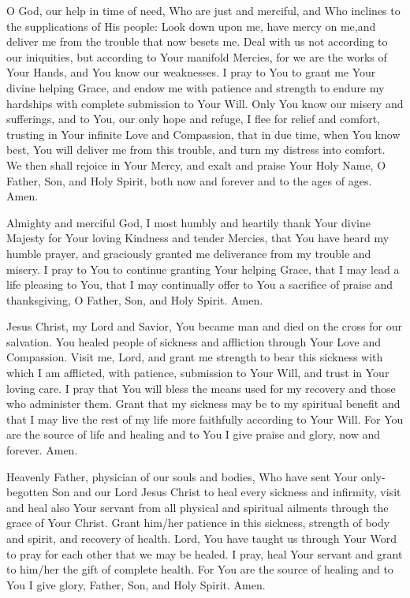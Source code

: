 O God, our help in time of need, Who are just and merciful, and Who inclines to the supplications of His people:
Look down upon me, have mercy on me,and deliver me from the trouble that now besets me.
Deal with us not according to our iniquities, but according to Your manifold Mercies, for we are the works of Your Hands, and You know our weaknesses.
I pray to You to grant me Your divine helping Grace, and endow me with patience and strength to endure my hardships with complete submission to Your Will.
Only You know our misery and sufferings, and to You, our only hope and refuge, I flee for relief and comfort, trusting in Your infinite Love and Compassion, that in due time, when You know best, You will deliver me from this trouble, and turn my distress into comfort.
We then shall rejoice in Your Mercy, and exalt and praise Your Holy Name, O Father, Son, and Holy Spirit, both now and forever and to the ages of ages.
Amen.

Almighty and merciful God, I most humbly and heartily thank Your divine Majesty for Your loving Kindness and tender Mercies, that You have heard my humble prayer, and graciously granted me deliverance from my trouble and misery.
I pray to You to continue granting Your helping Grace, that I may lead a life pleasing to You, that I may continually offer to You a sacrifice of praise and thanksgiving, O Father, Son, and Holy Spirit.
Amen.

Jesus Christ, my Lord and Savior, You became man and died on the cross for our salvation.
You healed people of sickness and affliction through Your Love and Compassion.
Visit me, Lord, and grant me strength to bear this sickness with which I am afflicted, with patience, submission to Your Will, and trust in Your loving care.
I pray that You will bless the means used for my recovery and those who administer them.
Grant that my sickness may be to my spiritual benefit and that I may live the rest of my life more faithfully according to Your Will.
For You are the source of life and healing and to You I give praise and glory, now and forever.
Amen.

Heavenly Father, physician of our souls and bodies, Who have sent Your only-begotten Son and our Lord Jesus Christ to heal every sickness and infirmity, visit and heal also Your servant \insertname from all physical and spiritual ailments through the grace of Your Christ.
Grant him/her patience in this sickness, strength of body and spirit, and recovery of health.
Lord, You have taught us through Your Word to pray for each other that we may be healed.
I pray, heal Your servant \insertname and grant to him/her the gift of complete health.
For You are the source of healing and to You I give glory, Father, Son, and Holy Spirit.
Amen.

